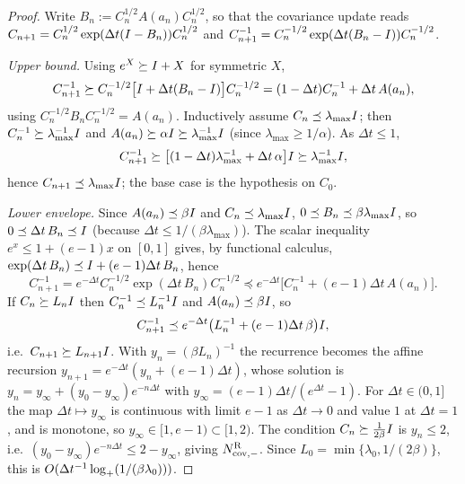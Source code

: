 \begin{proof}
Write $B_n:=C_n^{1/2}A(a_n)C_n^{1/2}$, so that the covariance update reads
$C_{n+1}=C_n^{1/2}\exp(\Delta t(I-B_n))C_n^{1/2}$ and
$C_{n+1}^{-1}=C_n^{-1/2}\exp(\Delta t(B_n-I))C_n^{-1/2}$.

\emph{Upper bound.} Using $e^X\succeq I+X$ for symmetric $X$,
\[
    C_{n+1}^{-1}
    \succeq
    C_n^{-1/2}\bigl[I+\Delta t(B_n-I)\bigr]C_n^{-1/2}
    =
    (1-\Delta t)C_n^{-1}+\Delta t\,A(a_n),
\]
using $C_n^{-1/2}B_nC_n^{-1/2}=A(a_n)$. Inductively assume $C_n\preceq\lambda_{\max}I$;
then $C_n^{-1}\succeq\lambda_{\max}^{-1}I$ and $A(a_n)\succeq\alpha I\succeq\lambda_{\max}^{-1}I$
(since $\lambda_{\max}\geq1/\alpha$). As $\Delta t\leq1$,
\[
    C_{n+1}^{-1}
    \succeq
    \bigl[(1-\Delta t)\lambda_{\max}^{-1}+\Delta t\,\alpha\bigr]I
    \succeq
    \lambda_{\max}^{-1}I,
\]
hence $C_{n+1}\preceq\lambda_{\max}I$; the base case is the hypothesis on $C_0$.

\emph{Lower envelope.} Since $A(a_n)\preceq\beta I$ and $C_n\preceq\lambda_{\max}I$,
$0\preceq B_n\preceq\beta\lambda_{\max}I$, so $0\preceq\Delta t\,B_n\preceq I$ (because
$\Delta t\leq1/(\beta\lambda_{\max})$). The scalar inequality $e^x\leq1+(e-1)x$ on $[0,1]$
gives, by functional calculus, $\exp(\Delta t\,B_n)\preceq I+(e-1)\Delta t\,B_n$, hence
\[
    C_{n+1}^{-1}
    =
    e^{-\Delta t}C_n^{-1/2}\exp(\Delta t\,B_n)C_n^{-1/2}
    \preceq
    e^{-\Delta t}\bigl[C_n^{-1}+(e-1)\Delta t\,A(a_n)\bigr].
\]
If $C_n\succeq L_nI$ then $C_n^{-1}\preceq L_n^{-1}I$ and $A(a_n)\preceq\beta I$, so
\[
    C_{n+1}^{-1}
    \preceq
    e^{-\Delta t}\bigl(L_n^{-1}+(e-1)\Delta t\,\beta\bigr)I,
\]
i.e.\ $C_{n+1}\succeq L_{n+1}I$. With $y_n=(\beta L_n)^{-1}$ the recurrence becomes the
affine recursion $y_{n+1}=e^{-\Delta t}(y_n+(e-1)\Delta t)$, whose solution is
$y_n=y_\infty+(y_0-y_\infty)e^{-n\Delta t}$ with $y_\infty=(e-1)\Delta t/(e^{\Delta t}-1)$.
For $\Delta t\in(0,1]$ the map $\Delta t\mapsto y_\infty$ is continuous with limit $e-1$ as
$\Delta t\to0$ and value $1$ at $\Delta t=1$, and is monotone, so $y_\infty\in[1,e-1)\subset[1,2)$.
The condition $C_n\succeq\tfrac1{2\beta}I$ is $y_n\leq2$, i.e.\
$(y_0-y_\infty)e^{-n\Delta t}\leq2-y_\infty$, giving $N_{\mathrm{cov},-}^{\mathrm{R}}$. Since $L_0=\min\{\lambda_0,1/(2\beta)\}$, this is
$O(\Delta t^{-1}\log_+(1/(\beta\lambda_0)))$.


\end{proof}
